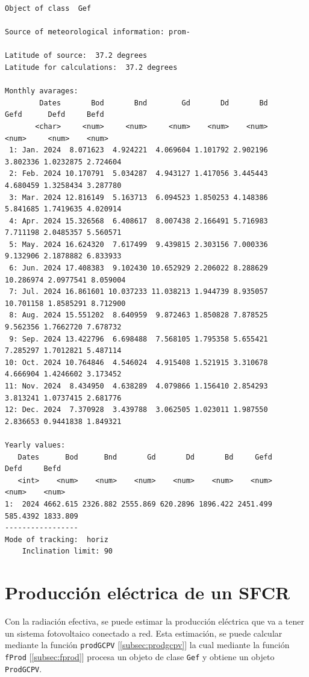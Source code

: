 \begin{verbatim}
Object of class  Gef 

Source of meteorological information: prom- 

Latitude of source:  37.2 degrees
Latitude for calculations:  37.2 degrees

Monthly avarages:
        Dates       Bod       Bnd        Gd       Dd       Bd      Gefd      Defd     Befd
       <char>     <num>     <num>     <num>    <num>    <num>     <num>     <num>    <num>
 1: Jan. 2024  8.071623  4.924221  4.069604 1.101792 2.902196  3.802336 1.0232875 2.724604
 2: Feb. 2024 10.170791  5.034287  4.943127 1.417056 3.445443  4.680459 1.3258434 3.287780
 3: Mar. 2024 12.816149  5.163713  6.094523 1.850253 4.148386  5.841685 1.7419635 4.020914
 4: Apr. 2024 15.326568  6.408617  8.007438 2.166491 5.716983  7.711198 2.0485357 5.560571
 5: May. 2024 16.624320  7.617499  9.439815 2.303156 7.000336  9.132906 2.1878882 6.833933
 6: Jun. 2024 17.408383  9.102430 10.652929 2.206022 8.288629 10.286974 2.0977541 8.059004
 7: Jul. 2024 16.861601 10.037233 11.038213 1.944739 8.935057 10.701158 1.8585291 8.712900
 8: Aug. 2024 15.551202  8.640959  9.872463 1.850828 7.878525  9.562356 1.7662720 7.678732
 9: Sep. 2024 13.422796  6.698488  7.568105 1.795358 5.655421  7.285297 1.7012821 5.487114
10: Oct. 2024 10.764846  4.546024  4.915408 1.521915 3.310678  4.666904 1.4246602 3.173452
11: Nov. 2024  8.434950  4.638289  4.079866 1.156410 2.854293  3.813241 1.0737415 2.681776
12: Dec. 2024  7.370928  3.439788  3.062505 1.023011 1.987550  2.836653 0.9441838 1.849321

Yearly values:
   Dates      Bod      Bnd       Gd       Dd       Bd     Gefd     Defd     Befd
   <int>    <num>    <num>    <num>    <num>    <num>    <num>    <num>    <num>
1:  2024 4662.615 2326.882 2555.869 620.2896 1896.422 2451.499 585.4392 1833.809
-----------------
Mode of tracking:  horiz 
    Inclination limit: 90
\end{verbatim}

\section{Producción eléctrica de un SFCR}
\label{sec:orgcc172fd}
\label{produccion-electrica-sfcr}
Con la radiación efectiva, se puede estimar la producción eléctrica que va a tener un sistema fotovoltaico conectado a red. Esta estimación, se puede calcular mediante la función \texttt{prodGCPV} [\ref{subsec:prodgcpv}] la cual mediante la función \texttt{fProd} [\ref{subsec:fprod}] procesa un objeto de clase \texttt{Gef} y obtiene un objeto \texttt{ProdGCPV}.

